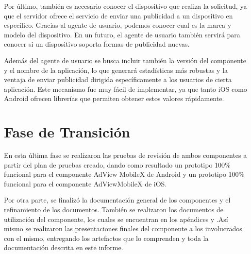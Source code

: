 Por último, también es necesario conocer el dispositivo que realiza
la solicitud, ya que el servidor ofrece el servicio de enviar una
publicidad a un dispositivo en específico. Gracias al agente de usuario,
podemos conocer cual es la marca y modelo del dispositivo. En un futuro,
el agente de usuario también servirá para conocer si un dispositivo
soporta formas de publicidad nuevas. 

Además del agente de usuario se busca incluir también la versión del
componente y el nombre de la aplicación, lo que generará estadísticas
más robustas y la ventaja de enviar publicidad dirigida específicamente
a los usuarios de cierta aplicación. Este mecanismo fue muy fácil
de implementar, ya que tanto iOS como Android ofrecen librerías que
permiten obtener estos valores rápidamente.


\section{Fase de Transición}

En esta última fase se realizaron las pruebas de revisión de ambos
componentes a partir del plan de pruebas creado, dando como resultado
un prototipo 100\% funcional para el componente AdView MobileX de
Android y un prototipo 100\% funcional para el componente AdViewMobileX
de iOS. 

Por otra parte, se finalizó la documentación general de los componentes
y el refinamiento de los documentos. También se realizaron los documentos
de utilización del componente, los cuales se encuentran en los apéndices
y .Así mismo se realizaron las presentaciones finales del componente
a los involucrados con el mismo, entregando los artefactos que lo
comprenden y toda la documentación descrita en este informe. 

\newpage{}
